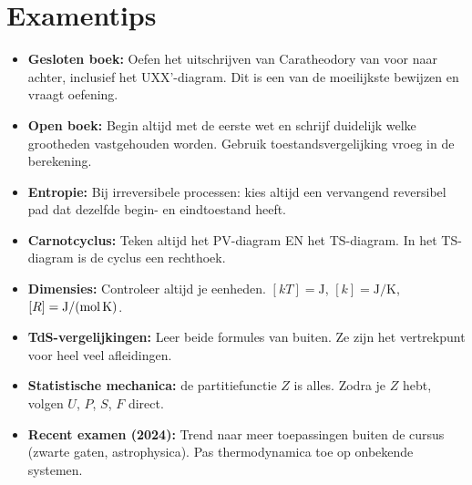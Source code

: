 \documentclass[10pt,a4paper]{article}
\begin{document}
\section{Examentips}
\begin{tip}
\begin{itemize}
  \item \textbf{Gesloten boek:} Oefen het uitschrijven van Caratheodory van voor naar achter, inclusief het UXX'-diagram. Dit is een van de moeilijkste bewijzen en vraagt oefening.
  \item \textbf{Open boek:} Begin altijd met de eerste wet en schrijf duidelijk welke grootheden vastgehouden worden. Gebruik toestandsvergelijking vroeg in de berekening.
  \item \textbf{Entropie:} Bij irreversibele processen: kies altijd een vervangend reversibel pad dat dezelfde begin- en eindtoestand heeft.
  \item \textbf{Carnotcyclus:} Teken altijd het PV-diagram EN het TS-diagram. In het TS-diagram is de cyclus een rechthoek.
  \item \textbf{Dimensies:} Controleer altijd je eenheden. $[kT] = \text{J}$, $[k] = \text{J/K}$, $[R] = \text{J/(mol\,K)}$.
  \item \textbf{TdS-vergelijkingen:} Leer beide formules van buiten. Ze zijn het vertrekpunt voor heel veel afleidingen.
  \item \textbf{Statistische mechanica:} de partitiefunctie $Z$ is alles. Zodra je $Z$ hebt, volgen $U$, $P$, $S$, $F$ direct.
  \item \textbf{Recent examen (2024):} Trend naar meer toepassingen buiten de cursus (zwarte gaten, astrophysica). Pas thermodynamica toe op onbekende systemen.
\end{itemize}
\end{tip}
\end{document}
